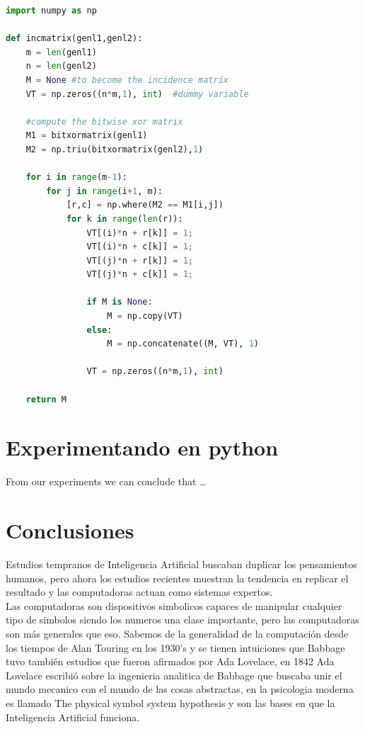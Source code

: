 \documentclass[a4paper, 11pt]{article}
\begin{document}
\begin{lstlisting}[language=Python, caption=Python example]
import numpy as np
    
def incmatrix(genl1,genl2):
    m = len(genl1)
    n = len(genl2)
    M = None #to become the incidence matrix
    VT = np.zeros((n*m,1), int)  #dummy variable
    
    #compute the bitwise xor matrix
    M1 = bitxormatrix(genl1)
    M2 = np.triu(bitxormatrix(genl2),1) 

    for i in range(m-1):
        for j in range(i+1, m):
            [r,c] = np.where(M2 == M1[i,j])
            for k in range(len(r)):
                VT[(i)*n + r[k]] = 1;
                VT[(i)*n + c[k]] = 1;
                VT[(j)*n + r[k]] = 1;
                VT[(j)*n + c[k]] = 1;
                
                if M is None:
                    M = np.copy(VT)
                else:
                    M = np.concatenate((M, VT), 1)
                
                VT = np.zeros((n*m,1), int)
    
    return M
\end{lstlisting}

\pagebreak

\section{Experimentando en python}

From our experiments we \cite{10038280} can conclude that \ldots

\pagebreak

\section{Conclusiones}

Estudios tempranos de Inteligencia Artificial buscaban duplicar los pensamientos humanos, pero ahora los estudios recientes muestran la tendencia en replicar el resultado y las computadoras actuan como sistemas expertos.\\

Las computadoras son dispositivos simbolicos capaces de manipular cualquier tipo de simbolos siendo los numeros una clase importante, pero las computadoras son más generales que eso. Sabemos de la generalidad de la computación desde los tiempos de Alan Touring en los 1930's y se tienen intuiciones que Babbage tuvo también estudios que fueron afirmados por Ada Lovelace, en 1842 Ada Lovelace escribió sobre la ingenieria analitica de Babbage que buscaba unir el mundo mecanico con el mundo de las cosas abstractas, en la psicologia moderna es llamado The physical symbol system hypothesis y son las bases en que la Inteligencia Artificial funciona.\\
\end{document}
